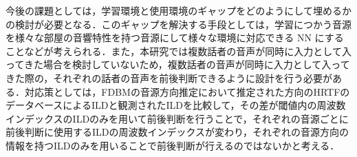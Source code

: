 今後の課題としては，学習環境と使用環境のギャップをどのようにして埋めるかの検討が必要となる．このギャップを解決する手段としては，学習につかう音源を様々な部屋の音響特性を持つ音源にして様々な環境に対応できる NN にすることなどが考えられる．また，本研究では複数話者の音声が同時に入力として入ってきた場合を検討していないため，複数話者の音声が同時に入力として入ってきた際の，それぞれの話者の音声を前後判断できるように設計を行う必要がある．対応策としては，FDBMの音源方向推定において推定された方向のHRTFのデータベースによるILDと観測されたILDを比較して，その差が閾値内の周波数インデックスのILDのみを用いて前後判断を行うことで，それぞれの音源ごとに前後判断に使用するILDの周波数インデックスが変わり，それぞれの音源方向の情報を持つILDのみを用いることで前後判断が行えるのではないかと考える．

